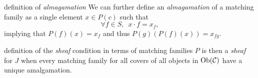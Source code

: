 \begin{frame}
\begin{block}{definition of {\it almagamation}}
We can further define an {\it almagamation} of a matching family as a single element $x \in P(c)$ such that
$$
\forall f \in S, \,\,\, x \cdot f = x_f,
$$
implying that $P(f)(x)=x_f$ and thus $P(g)(P(f)(x))=x_{fg}$. 
\end{block}
\begin{block}{definition of the {\it sheaf} condition in terms of matching families}
$P$ is then a {\it sheaf} for $J$ when every matching family for all covers of all objects in $\mathop{\rm Ob}\nolimits({\mathcal C})$ have a unique amalgamation. 
\end{block}
\end{frame}